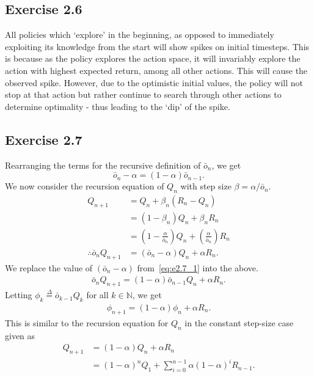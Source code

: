 \documentclass[10pt]{article}
\newcommand{\ldef}{\stackrel{\Delta}{=}}
\begin{document}
	\subsection*{Exercise 2.6}
	\label{ss:2.6}
	All policies which `explore' in the beginning, as opposed to immediately exploiting its knowledge from the start will show spikes on initial timesteps. This is because as the policy explores the action space, it will invariably explore the action with highest expected return, among all other actions. This will cause the observed spike. However, due to the optimistic initial values, the policy will not stop at that action but rather continue to search through other actions to determine optimality - thus leading to the `dip' of the spike.
	\subsection*{Exercise 2.7}
	\label{ss:2.7}
	Rearranging the terms for the recursive definition of $\bar{o}_n$, we get
	\begin{equation}
	\label{eq:e2.7_1}
	\bar{o}_n-\alpha = (1-\alpha)\bar{o}_{n-1}.
	\end{equation}
	We now consider the recursion equation of $Q_n$ with step size $\beta = \alpha/\bar{o}_n$.
	\begin{align*}
	Q_{n+1} &= Q_n + \beta_n (R_n - Q_n)\\
	&= (1-\beta_n)Q_n + \beta_n R_n\\
	&= \left(1-\frac{\alpha}{\bar{o}_n}\right)Q_n + \left( \frac{\alpha}{\bar{o}_n} \right)R_n\\
	\therefore \bar{o}_n Q_{n+1} &= (\bar{o}_n - \alpha)Q_n + \alpha R_n.
	\end{align*}
	We replace the value of $(\bar{o}_n-\alpha)$ from~\eqref{eq:e2.7_1} into the above.
	\begin{align*}
	\bar{o}_nQ_{n+1} = (1-\alpha)\bar{o}_{n-1}Q_n + \alpha R_n.
	\end{align*}
	Letting $\phi_k \ldef \bar{o}_{k-1}Q_k$ for all $k\in\mathbb{N}$, we get
	\begin{align*}
	\phi_{n+1} = (1-\alpha)\phi_n + \alpha R_n.
	\end{align*}
	This is similar to the recursion equation for $Q_n$ in the constant step-size case given as
	\begin{align*}
	Q_{n+1} &= (1-\alpha)Q_n + \alpha R_n\\
	&= (1-\alpha)^n Q_1 + \sum_{i=0}^{n-1} \alpha(1-\alpha)^i R_{n-1}.
	\end{align*}
\end{document}
